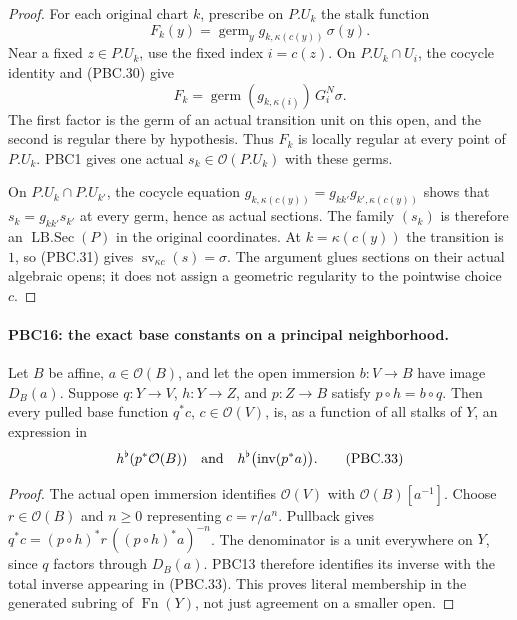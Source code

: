\documentclass[11pt,a4paper]{article}
\numberwithin{equation}{section}
\theoremstyle{remark}\newtheorem{remark}[theorem]{Remark}
\begin{document}
\begin{proof}
For each original chart $k$, prescribe on $P.U_k$ the stalk function
\[
 F_k(y)=
   \operatorname{germ}_y g_{k,\kappa(c(y))}\,\sigma(y).
                                                        \tag{PBC.31}
\]
Near a fixed $z\in P.U_k$, use the fixed index $i=c(z)$.
On $P.U_k\cap U_i$, the cocycle identity and (PBC.30) give
\[
 F_k=
   \operatorname{germ}(g_{k,\kappa(i)})\,G_i^N\sigma.
                                                        \tag{PBC.32}
\]
The first factor is the germ of an actual transition unit on
this open, and the second is regular there by hypothesis.
Thus $F_k$ is locally regular at every point of $P.U_k$.
PBC1 gives one actual $s_k\in\mathcal O(P.U_k)$ with these germs.

On $P.U_k\cap P.U_{k'}$, the cocycle equation
$g_{k,\kappa(c(y))}=g_{kk'}g_{k',\kappa(c(y))}$
shows that $s_k=g_{kk'}s_{k'}$ at every germ, hence as
actual sections.  The family $(s_k)$ is therefore an
$\operatorname{LB.Sec}(P)$ in the original coordinates.
At $k=\kappa(c(y))$ the transition is $1$, so (PBC.31)
gives $\operatorname{sv}_{\kappa c}(s)=\sigma$.
The argument glues sections on their actual algebraic opens;
it does not assign a geometric regularity to the pointwise
choice $c$.
\end{proof}

\paragraph{PBC16: the exact base constants on a principal neighborhood.}
\label{claim:PBC16}
Let $B$ be affine, $a\in\mathcal O(B)$, and let the open
immersion $b:V\to B$ have image $D_B(a)$.  Suppose
$q:Y\to V$, $h:Y\to Z$, and $p:Z\to B$ satisfy
$p\circ h=b\circ q$.  Then every pulled base function
$q^*c$, $c\in\mathcal O(V)$, is, as a function of all
stalks of $Y$, an expression in
\[
 h^\flat(p^*\mathcal O(B))
       \quad\hbox{and}\quad
 h^\flat\bigl(\operatorname{inv}(p^*a)\bigr).
                                                        \tag{PBC.33}
\]

\begin{proof}
The actual open immersion identifies
$\mathcal O(V)$ with $\mathcal O(B)[a^{-1}]$.
Choose $r\in\mathcal O(B)$ and $n\ge0$ representing $c=r/a^n$.
Pullback gives
$q^*c=(p\circ h)^*r\,((p\circ h)^*a)^{-n}$.
The denominator is a unit everywhere on $Y$, since $q$ factors
through $D_B(a)$.  PBC13 therefore identifies its inverse with
the total inverse appearing in (PBC.33).
This proves literal membership in the generated subring of
$\operatorname{Fn}(Y)$, not just agreement on a smaller open.
\end{proof}
\end{document}
